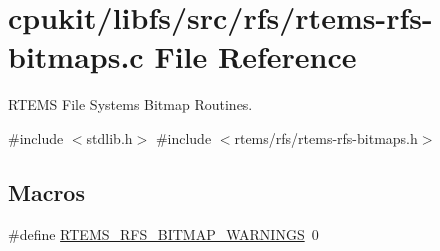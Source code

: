 \hypertarget{rtems-rfs-bitmaps_8c}{}\section{cpukit/libfs/src/rfs/rtems-\/rfs-\/bitmaps.c File Reference}
\label{rtems-rfs-bitmaps_8c}


R\+T\+E\+MS File Systems Bitmap Routines.  


{\ttfamily \#include $<$stdlib.\+h$>$}\newline
{\ttfamily \#include $<$rtems/rfs/rtems-\/rfs-\/bitmaps.\+h$>$}\newline
\subsection*{Macros}
\begin{DoxyCompactItemize}
\item 
\#define \mbox{\hyperlink{rtems-rfs-bitmaps_8c_a79f700881a8cd7db9993db7ce97502e8}{R\+T\+E\+M\+S\+\_\+\+R\+F\+S\+\_\+\+B\+I\+T\+M\+A\+P\+\_\+\+W\+A\+R\+N\+I\+N\+GS}}~0
\end{DoxyCompactItemize}

